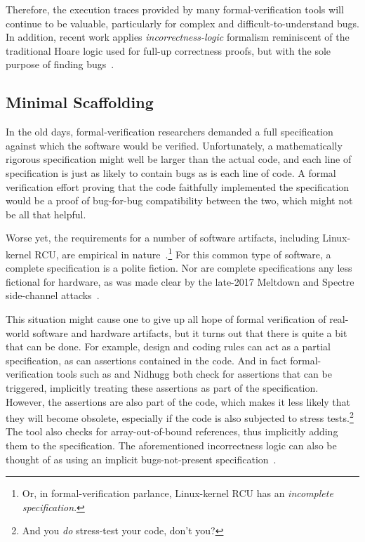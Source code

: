 Therefore, the execution traces provided
by many formal-verification tools will continue to be valuable,
particularly for complex and difficult-to-understand bugs.
In addition, recent work applies \emph{incorrectness-logic}
formalism reminiscent of the traditional Hoare logic used for
full-up correctness proofs, but with the sole purpose of finding
bugs~\cite{PeterWOHearn2019incorrectnessLogic}.

\fi

\subsection{Minimal Scaffolding}
\label{sec:future:Minimal Scaffolding}

In the old days, formal-verification researchers demanded a full
specification against which the software would be verified.
Unfortunately, a mathematically rigorous specification might well
be larger than the actual code, and each line of specification
is just as likely to contain bugs as is each line of code.
A formal verification effort proving that the code faithfully implemented
the specification would be a proof of bug-for-bug compatibility between
the two, which might not be all that helpful.

Worse yet, the requirements for a number of software artifacts,
including Linux-kernel RCU, are empirical in
nature~\cite{PaulEMcKenney2015RCUreqts1,PaulEMcKenney2015RCUreqts2,PaulEMcKenney2015RCUreqts3}.\footnote{
	Or, in formal-verification parlance, Linux-kernel RCU has an
	\emph{incomplete specification}.}
For this common type of software, a complete specification is a
polite fiction.
Nor are complete specifications any less fictional for hardware,
as was made clear by the late-2017 Meltdown and Spectre side-channel
attacks~\cite{JannHorn2018MeltdownSpectre}.

This situation might cause one to give up all hope of formal verification
of real-world software and hardware artifacts, but it turns out that there is
quite a bit that can be done.
For example, design and coding rules can act as a partial specification,
as can assertions contained in the code.
And in fact formal-verification tools such as  and Nidhugg
both check for assertions that can be triggered, implicitly treating
these assertions as part of the specification.
However, the assertions are also part of the code, which makes it less
likely that they will become obsolete, especially if the code is
also subjected to stress tests.\footnote{
	And you \emph{do} stress-test your code, don't you?}
The  tool also checks for array-out-of-bound references,
thus implicitly adding them to the specification.
The aforementioned incorrectness logic can also be thought of as using
an implicit bugs-not-present
specification~\cite{PeterWOHearn2019incorrectnessLogic}.

